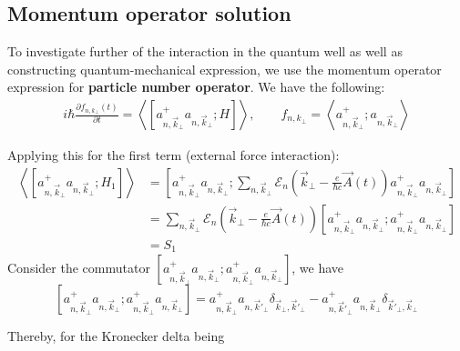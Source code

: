 \documentclass{article}
\begin{document}
\subsection{Momentum operator solution}

To investigate further of the interaction in the quantum well as well as constructing quantum-mechanical expression, we use the momentum operator expression for \textbf{particle number operator}. We have the following: 
\begin{align}
    i \hbar \frac{\partial f_{n, k_{\perp}}(t)}{\partial t} = \left\langle \left[ a^{+}_{n,\vec{k}_{\perp}}  a_{n,\vec{k}_{\perp}}; H \right] \right\rangle, \quad \quad f_{n, k_{\perp}} = \left\langle a^{+}_{n,\vec{k}_{\perp}} ; a_{n,\vec{k}_{\perp}} \right\rangle
\end{align}

Applying this for the first term (external force interaction): 
\begin{align}
    \left\langle \left[ a^{+}_{n,\vec{k}_{\perp}}  a_{n,\vec{k}_{\perp}}; H_{1} \right] \right\rangle & = \left[ a^{+}_{n,\vec{k}_{\perp}}  a_{n,\vec{k}_{\perp}}; \sum_{n,\vec{k}_{\perp}} \mathcal{E}_{n}\left(\vec{k}_{\perp} - \frac{e}{\hbar c} \vec{A}(t)\right)a^{+}_{n,\vec{k}_{\perp}} a_{n,\vec{k}_{\perp}} \right] \\
    & = \sum_{n,\vec{k}_{\perp}} \mathcal{E}_{n}\left(\vec{k}_{\perp} - \frac{e}{\hbar c} \vec{A}(t)\right)\left[ a^{+}_{n,\vec{k}_{\perp}}  a_{n,\vec{k}_{\perp}}; a^{+}_{n,\vec{k}_{\perp}} a_{n,\vec{k}_{\perp}} \right]\\
    & = S_{1}
\end{align}
Consider the commutator $\left[ a^{+}_{n,\vec{k}_{\perp}}  a_{n,\vec{k}_{\perp}}; a^{+}_{n,\vec{k}_{\perp}} a_{n,\vec{k}_{\perp}} \right]$, we have 
\begin{equation}
    \left[ a^{+}_{n,\vec{k}_{\perp}}  a_{n,\vec{k}_{\perp}}; a^{+}_{n,\vec{k}_{\perp}} a_{n,\vec{k}_{\perp}} \right] = a^{+}_{n,\vec{k}_{\perp}} a_{n,\vec{k}'_{\perp}} \delta_{\vec{k}_{\perp},\vec{k}'_{\perp}} - a^{+}_{n,\vec{k}'_{\perp}} a_{n,\vec{k}_{\perp}} \delta_{\vec{k}'_{\perp},\vec{k}_{\perp}}
\end{equation}

Thereby, for the Kronecker delta being 
\end{document}
